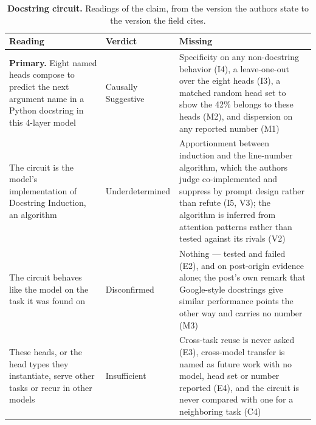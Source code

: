 \clearpage
\begin{table}[H]
\centering
\footnotesize
\caption{\textbf{Docstring circuit.} Readings of the claim, from the version the authors state to the version the
field cites.}
\label{tab:docstring-readings}
\renewcommand{\arraystretch}{1.18}
\begin{tabular}{@{}>{\raggedright\arraybackslash}p{3.3cm}l>{\raggedright\arraybackslash}p{4.4cm}@{}}
\toprule
\textbf{Reading} & \textbf{Verdict} & \textbf{Missing} \\
\midrule
\textbf{Primary.} Eight named heads compose to predict the next argument name in a Python docstring in this 4-layer model
  & Causally Suggestive
  & Specificity on any non-docstring behavior (I4), a leave-one-out over the eight heads (I3), a matched random head set to show the 42\% belongs to these heads (M2), and dispersion on any reported number (M1) \\
\addlinespace[2pt]
The circuit is the model's implementation of Docstring Induction, an algorithm
  & Underdetermined
  & Apportionment between induction and the line-number algorithm, which the authors judge co-implemented and suppress by prompt design rather than refute (I5, V3); the algorithm is inferred from attention patterns rather than tested against its rivals (V2) \\
\addlinespace[2pt]
The circuit behaves like the model on the task it was found on
  & Disconfirmed
  & Nothing --- tested and failed (E2), and on post-origin evidence alone; the post's own remark that Google-style docstrings give similar performance points the other way and carries no number (M3) \\
\addlinespace[2pt]
These heads, or the head types they instantiate, serve other tasks or recur in other models
  & Insufficient
  & Cross-task reuse is never asked (E3), cross-model transfer is named as future work with no model, head set or number reported (E4), and the circuit is never compared with one for a neighboring task (C4) \\
\bottomrule
\end{tabular}
\end{table}

